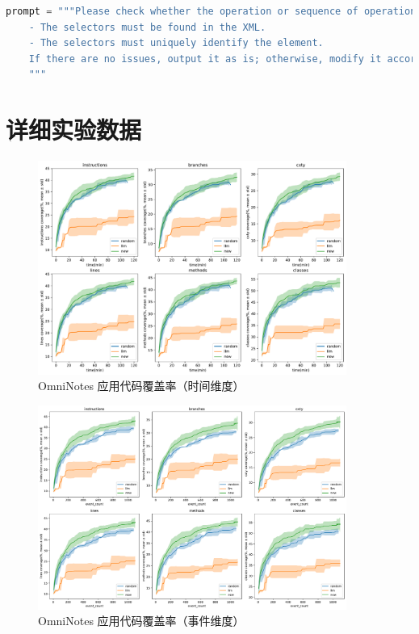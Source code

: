 \documentclass[twocolumn, 10pt]{article}
\begin{document}
\begin{lstlisting}[language=python, caption=操作检查]
    prompt = """Please check whether the operation or sequence of operations you just generated meets the requirements:
    - The selectors must be found in the XML.
    - The selectors must uniquely identify the element.
    If there are no issues, output it as is; otherwise, modify it accordingly.
    """
\end{lstlisting}


\section{详细实验数据}

\begin{figure}[H]
\centering
\includegraphics[width=0.9\textwidth]{it.feio.android.omninotes.alpha/coverage_time.pdf}
\caption{OmniNotes 应用代码覆盖率（时间维度）}
\end{figure}

\begin{figure}[H]
\centering
\includegraphics[width=0.9\textwidth]{it.feio.android.omninotes.alpha/coverage_event.pdf}
\caption{OmniNotes 应用代码覆盖率（事件维度）}
\end{figure}
\end{document}
